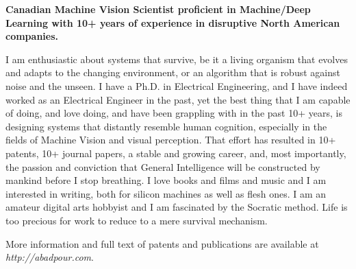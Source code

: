\onehalfspace
\textbf{\large Canadian Machine Vision Scientist proficient in Machine/Deep Learning with 10+ years of experience in disruptive North American companies.}
\singlespace

\vspace{1cm}

I am enthusiastic about systems that survive, be it a living organism that evolves and adapts to the changing environment, or an algorithm that is robust against noise and the unseen. I have a Ph.D. in Electrical Engineering, and I have indeed worked as an Electrical Engineer in the past, yet the best thing that I am capable of doing, and love doing, and have been grappling with in the past 10+ years, is designing systems that distantly resemble human cognition, especially in the fields of Machine Vision and visual perception. That effort has resulted in 10+ patents, 10+ journal papers, a stable and growing career, and, most importantly, the passion and conviction that General Intelligence will be constructed by mankind before I stop breathing. I love books and films and music and I am interested in writing, both for silicon machines as well as flesh ones. I am an amateur digital arts hobbyist and I am fascinated by the Socratic method. Life is too precious for work to reduce to a mere survival mechanism.

\vspace{0.5cm}
More information and full text of patents and publications are available at \emph{http://abadpour.com}.

\vspace{1.5cm}
